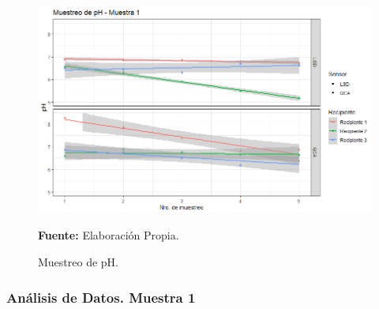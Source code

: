     \begin{figure}[H]
        \centering
        \includegraphics[width=0.75\linewidth]{Imagenes/cap4/pH_M1.png}
        \caption {Muestreo de pH. }{\textbf{Fuente:}
        Elaboraci\'on Propia. }
        \label{fig:M1PH}
    \end{figure}

\subsubsection{An\'alisis de Datos. Muestra 1}

